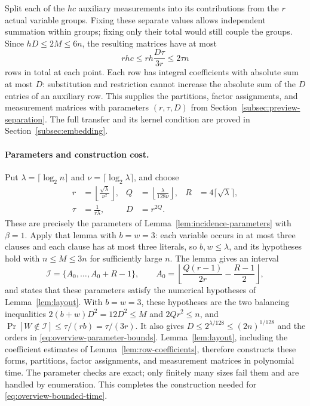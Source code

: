 Split each of the $hc$ auxiliary measurements into its contributions
from the $r$ actual variable groups. Fixing these separate values
allows independent summation within groups; fixing only their total
would still couple the groups. Since $hD\le2M\le6n$, the resulting
matrices have at most
\[
 rhc\le rh\frac{D\tau}{3r}\le2\tau n
\]
rows in total at each point. Each row has integral coefficients
with absolute sum at most $D$: substitution and restriction cannot
increase the absolute sum of the $D$ entries of an auxiliary row.
This supplies the partitions, factor assignments, and measurement matrices with parameters $(r,\tau,D)$ from
Section~\ref{subsec:preview-separation}. The full transfer and its
kernel condition are proved in Section~\ref{subsec:embedding}.

\paragraph{Parameters and construction cost.}
Put $\lambda=\lceil\log_2 n\rceil$ and
$\nu=\lceil\log_2\lambda\rceil$, and choose
\begin{equation}\label{eq:overview-explicit-parameters}
 \begin{aligned}
 r&=\left\lfloor\frac{\sqrt\lambda}{\nu^2}\right\rfloor,
 &Q&=\left\lfloor\frac{\lambda}{128\nu}\right\rfloor,
 &R&=4\lceil\sqrt\lambda\rceil,\\
 \tau&=\frac1{r\lambda},&D&=r^{2Q}.
 \end{aligned}
\end{equation}
These are precisely the parameters of
Lemma~\ref{lem:incidence-parameters} with $\beta=1$.
Apply that lemma with $b=w=3$: each variable occurs in at most three
clauses and each clause has at most three literals, so
$b,w\le\lambda$, and its hypotheses hold with $n\le M\le3n$ for
sufficiently large $n$. The lemma gives an interval
\[
 \mathcal I=\{A_0,\ldots,A_0+R-1\},\qquad
 A_0=\left\lfloor\frac{Q(r-1)}{2r}-\frac{R-1}{2}\right\rfloor,
\]
and states that these parameters satisfy the numerical hypotheses of
Lemma~\ref{lem:layout}. With $b=w=3$, these hypotheses are the two
balancing inequalities $2(b+w)D^2=12D^2\le M$ and $2Qr^2\le n$, and
$\Pr[W\notin\mathcal I]\le\tau/(rb)=\tau/(3r)$.
It also gives $D\le2^{\lambda/128}\le(2n)^{1/128}$ and the
orders in \eqref{eq:overview-parameter-bounds}.
Lemma~\ref{lem:layout}, including the coefficient estimates of
Lemma~\ref{lem:row-coefficients}, therefore constructs these forms, partitions, factor assignments,
and measurement matrices in polynomial time. The parameter checks are exact;
only finitely many sizes fail them and are handled by enumeration.
This completes the construction needed for
\eqref{eq:overview-bounded-time}.


